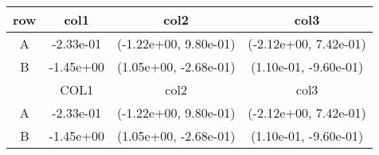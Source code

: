 \begin{tabular}{cccc}
\toprule
row&col1&col2&col3\tabularnewline
\midrule
A&-2.33e-01& (-1.22e+00, 9.80e-01)& (-2.12e+00, 7.42e-01)\tabularnewline
B&-1.45e+00& (1.05e+00, -2.68e-01)& (1.10e-01, -9.60e-01)\tabularnewline
\midrule
&COL1&col2&col3\tabularnewline
\midrule
A&-2.33e-01& (-1.22e+00, 9.80e-01)& (-2.12e+00, 7.42e-01)\tabularnewline
B&-1.45e+00& (1.05e+00, -2.68e-01)& (1.10e-01, -9.60e-01)\tabularnewline
\bottomrule
\end{tabular}
